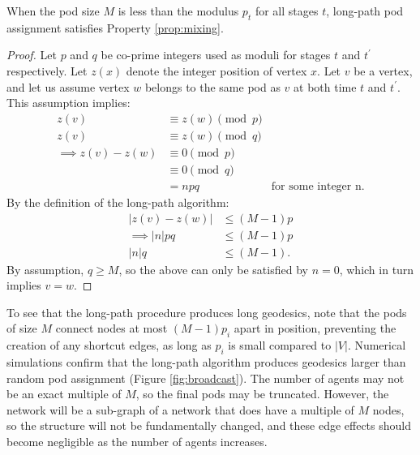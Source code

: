 \begin{claim}
When the pod size $M$ is less than the modulus $p_t$ for all stages $t$, long-path pod assignment satisfies Property \ref{prop:mixing}.
\end{claim}

\begin{proof}
Let $p$ and $q$ be co-prime integers used as moduli for stages $t$ and $t^\prime$ respectively.
Let $z(x)$ denote the integer position of vertex $x$.
Let $v$ be a vertex, and let us assume vertex $w$ belongs to the same pod as $v$ at both time $t$ and $t^\prime$.
This assumption implies:
\begin{align*}
    z(v) &\equiv z(w) \pmod{p} \\
    z(v) &\equiv z(w) \pmod{q} \\
    \implies z(v) - z(w) &\equiv 0 \pmod{p} \\
    &\equiv 0 \pmod{q} \\
    &= npq & \text{for some integer n}.
\end{align*}
By the definition of the long-path algorithm:
\begin{align*}
    |z(v)-z(w)| & \leq (M - 1)p \\
    \implies |n|pq & \leq (M - 1)p \\
    |n|q & \leq (M - 1).
\end{align*}
By assumption, $q \geq M$, so the above can only be satisfied by $n=0$,
which in turn implies $v=w$. \qedhere
\end{proof}

To see that the long-path procedure produces long geodesics, note that the pods of size $M$ connect nodes at most $(M - 1)p_i$ apart in position, preventing the creation of any shortcut edges, as long as $p_i$ is small compared to $|V|$.
Numerical simulations confirm that the long-path algorithm produces geodesics larger than random pod assignment (Figure \ref{fig:broadcast}).
The number of agents may not be an exact multiple of $M$, so the final pods may be truncated. However, the network will be a sub-graph of a network that does have a multiple of $M$ nodes, so the structure will not be fundamentally changed, and these edge effects should become negligible as the number of agents increases.



